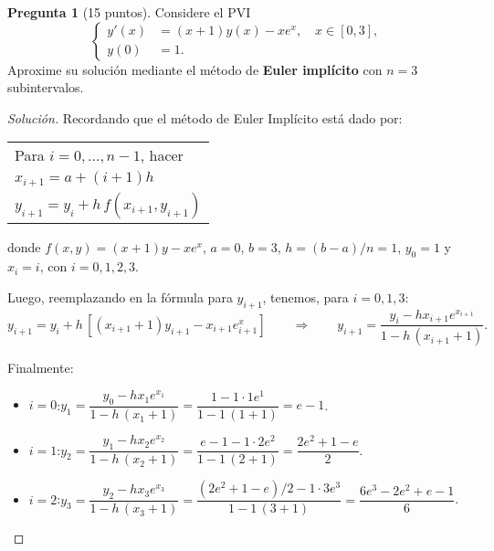 \documentclass[letterpaper,12pt]{article}
\theoremstyle{definition}
\newtheorem{question}{Pregunta}
\numberwithin{equation}{question}
\newenvironment{solution}{\begin{proof}[Solución]}{\end{proof}}
\begin{document}
\begin{question}[15 puntos]
Considere el PVI
%
\begin{equation}\label{PVI-1}
\left\{\begin{aligned}
y'(x) & = (x+1) y(x) - x e^x, \quad x \in [0,3],\\
y(0) & = 1.
\end{aligned}\right.
\end{equation}
%
Aproxime su solución mediante el método de \textbf{Euler implícito} con $n = 3$ subintervalos.
\begin{solution}
Recordando que el m\'etodo de Euler Impl\'icito est\'a dado por:
\begin{center}
\begin{tabular}{|l|}
\hline
Para $i=0,\ldots, n-1$, hacer\\
\quad  $x_{i+1}=a+(i+1)h$\\
\quad $y_{i+1}=y_{i}+h\,f(x_{i+1},y_{i+1})$\\
\hline
\end{tabular}
\end{center}\medskip

donde $f(x,y)=(x+1) y - x e^x$, $a=0$, $b=3$, $h=(b-a)/n=1$, $y_0=1$ y $x_i=i$, con $i=0,1,2,3$.

\smallskip
\noindent{}\medskip

Luego, reemplazando en la f\'ormula para $y_{i+1}$, tenemos, para $i=0,1,3$:
$$
y_{i+1}=y_i+h\,\left[(x_{i+1}+1) y_{i+1} - x_{i+1} e^x_{i+1}\right] \qquad \Longrightarrow\qquad y_{i+1}=\dfrac{y_i-hx_{i+1
}e^{x_{i+1}}}{1-h\,(x_{i+1}+1)}.
$$

\smallskip
\noindent{}\medskip

Finalmente:
\begin{itemize}
\item $i=0$:\quad  $y_1=\dfrac{y_0-hx_{1
}e^{x_{1}}}{1-h\,(x_{1}+1)}=\dfrac{1-1\cdot 1e^{1}}{1-1\,(1+1)}=e-1$.
\item $i=1$:\quad  $y_2=\dfrac{y_1-hx_{2
}e^{x_{2}}}{1-h\,(x_{2}+1)}=\dfrac{e-1-1\cdot 2e^{2}}{1-1\,(2+1)}=\dfrac{2e^2+1-e}{2}$.
\item $i=2$:\quad  $y_3=\dfrac{y_2-hx_{3
}e^{x_{3}}}{1-h\,(x_{3}+1)}=\dfrac{(2e^2+1-e)/2-1\cdot 3e^{3}}{1-1\,(3+1)}=\dfrac{6e^3-2e^2+e-1}{6}$.
\end{itemize}

\smallskip
\noindent{}\medskip
\end{solution}
\end{question}
\end{document}
